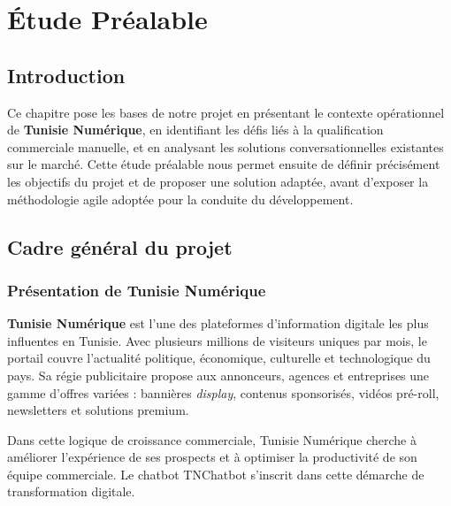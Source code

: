\documentclass[12pt,a4paper]{report}
\begin{document}
\chapter{Étude Préalable}
\minitoc
\newpage

\section{Introduction}

Ce chapitre pose les bases de notre projet en présentant le contexte opérationnel de
\textbf{Tunisie Numérique}, en identifiant les défis liés à la qualification commerciale
manuelle, et en analysant les solutions conversationnelles existantes sur le marché. Cette
étude préalable nous permet ensuite de définir précisément les objectifs du projet et de
proposer une solution adaptée, avant d'exposer la méthodologie agile adoptée pour la
conduite du développement.

\section{Cadre général du projet}

\subsection{Présentation de Tunisie Numérique}

\textbf{Tunisie Numérique} est l'une des plateformes d'information digitale les plus influentes
en Tunisie. Avec plusieurs millions de visiteurs uniques par mois, le portail couvre l'actualité
politique, économique, culturelle et technologique du pays. Sa régie publicitaire propose
aux annonceurs, agences et entreprises une gamme d'offres variées : bannières
\textit{display}, contenus sponsorisés, vidéos pré-roll, newsletters et solutions premium.

Dans cette logique de croissance commerciale, Tunisie Numérique cherche à améliorer
l'expérience de ses prospects et à optimiser la productivité de son équipe commerciale. Le
chatbot TNChatbot s'inscrit dans cette démarche de transformation digitale.
\end{document}
